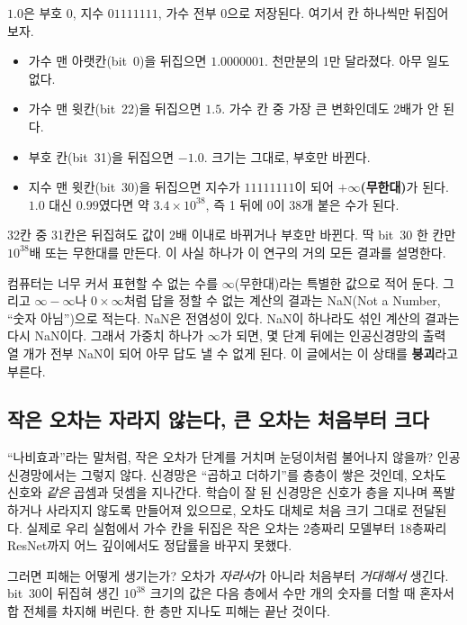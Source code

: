 \documentclass[11pt,a4paper]{article}
\newcounter{easy}
\newcounter{calc}
\begin{document}
\begin{calc}
$1.0$은 부호 0, 지수 $01111111$, 가수 전부 0으로 저장된다. 여기서 칸 하나씩만 뒤집어 보자.
\begin{itemize}[nosep,leftmargin=1.6em]
  \item 가수 맨 아랫칸(bit~0)을 뒤집으면 $1.0000001$. 천만분의 1만 달라졌다. 아무 일도 없다.
  \item 가수 맨 윗칸(bit~22)을 뒤집으면 $1.5$. 가수 칸 중 가장 큰 변화인데도 2배가 안 된다.
  \item 부호 칸(bit~31)을 뒤집으면 $-1.0$. 크기는 그대로, 부호만 바뀐다.
  \item 지수 맨 윗칸(bit~30)을 뒤집으면 지수가 $11111111$이 되어 \textbf{$+\infty$(무한대)}가 된다. $1.0$ 대신 $0.99$였다면 약 $3.4\times10^{38}$, 즉 1 뒤에 0이 38개 붙은 수가 된다.
\end{itemize}
32칸 중 31칸은 뒤집혀도 값이 2배 이내로 바뀌거나 부호만 바뀐다. 딱 bit~30 한 칸만 $10^{38}$배 또는 무한대를 만든다. 이 사실 하나가 이 연구의 거의 모든 결과를 설명한다.
\end{calc}

\begin{easy}[무한대와 ``숫자 아님'']
컴퓨터는 너무 커서 표현할 수 없는 수를 $\infty$(무한대)라는 특별한 값으로 적어 둔다. 그리고 $\infty-\infty$나 $0\times\infty$처럼 답을 정할 수 없는 계산의 결과는 NaN(Not a Number, ``숫자 아님'')으로 적는다. NaN은 전염성이 있다. NaN이 하나라도 섞인 계산의 결과는 다시 NaN이다. 그래서 가중치 하나가 $\infty$가 되면, 몇 단계 뒤에는 인공신경망의 출력 열 개가 전부 NaN이 되어 아무 답도 낼 수 없게 된다. 이 글에서는 이 상태를 \textbf{붕괴}라고 부른다.
\end{easy}

\subsection{작은 오차는 자라지 않는다, 큰 오차는 처음부터 크다}
``나비효과''라는 말처럼, 작은 오차가 단계를 거치며 눈덩이처럼 불어나지 않을까? 인공신경망에서는 그렇지 않다. 신경망은 ``곱하고 더하기''를 층층이 쌓은 것인데, 오차도 신호와 \emph{같은} 곱셈과 덧셈을 지나간다. 학습이 잘 된 신경망은 신호가 층을 지나며 폭발하거나 사라지지 않도록 만들어져 있으므로, 오차도 대체로 처음 크기 그대로 전달된다. 실제로 우리 실험에서 가수 칸을 뒤집은 작은 오차는 2층짜리 모델부터 18층짜리 ResNet까지 어느 깊이에서도 정답률을 바꾸지 못했다.

그러면 피해는 어떻게 생기는가? 오차가 \emph{자라서}가 아니라 처음부터 \emph{거대해서} 생긴다. bit~30이 뒤집혀 생긴 $10^{38}$ 크기의 값은 다음 층에서 수만 개의 숫자를 더할 때 혼자서 합 전체를 차지해 버린다. 한 층만 지나도 피해는 끝난 것이다.
\end{document}
